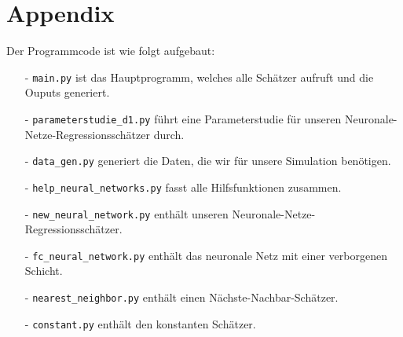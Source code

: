 \chapter*{Appendix}
\label{chap:app}

Der Programmcode ist wie folgt aufgebaut:
\begin{itemize}
    \item[-] \texttt{main.py} ist das Hauptprogramm, welches alle Schätzer aufruft und die Ouputs generiert.
    \item[-] \texttt{parameterstudie\_d1.py} führt eine Parameterstudie für unseren Neuronale-Netze-Regressionsschätzer durch.
    \item[-] \texttt{data\_gen.py} generiert die Daten, die wir für unsere Simulation benötigen.
    \item[-] \texttt{help\_neural\_networks.py} fasst alle Hilfsfunktionen zusammen.
    \item[-] \texttt{new\_neural\_network.py} enthält unseren Neuronale-Netze-Regressionsschätzer.
    \item[-] \texttt{fc\_neural\_network.py} enthält das neuronale Netz mit einer verborgenen Schicht.
    \item[-] \texttt{nearest\_neighbor.py} enthält einen Nächste-Nachbar-Schätzer.
    \item[-] \texttt{constant.py} enthält den konstanten Schätzer.
\end{itemize}
\renewcommand\lstlistingname{Listing}







